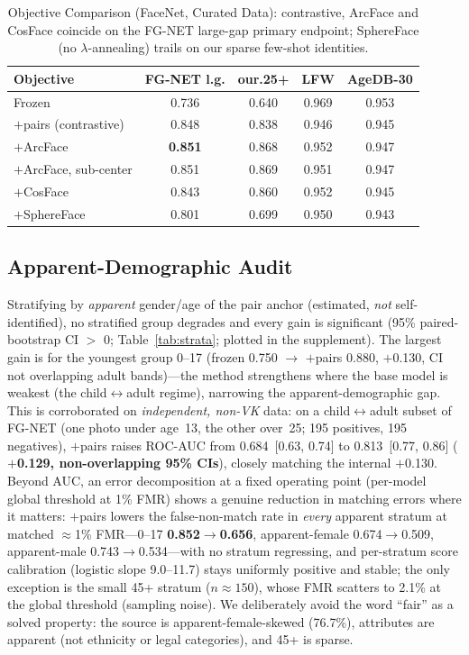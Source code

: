 \documentclass[journal]{IEEEtran}
\begin{document}
\begin{table}[!t]
\renewcommand{\arraystretch}{1.2}
\caption{Objective Comparison (FaceNet, Curated Data): contrastive, ArcFace and CosFace coincide on the FG-NET large-gap primary endpoint; SphereFace (no $\lambda$-annealing) trails on our sparse few-shot identities.}
\label{tab:objective}
\centering
\footnotesize
\begin{tabular}{@{}lcccc@{}}
\toprule
Objective & FG-NET l.g. & our.25+ & LFW & AgeDB-30 \\
\midrule
Frozen & 0.736 & 0.640 & 0.969 & 0.953 \\
$+$pairs (contrastive) & 0.848 & 0.838 & 0.946 & 0.945 \\
$+$ArcFace & \textbf{0.851} & 0.868 & 0.952 & 0.947 \\
$+$ArcFace, sub-center & 0.851 & 0.869 & 0.951 & 0.947 \\
$+$CosFace & 0.843 & 0.860 & 0.952 & 0.945 \\
$+$SphereFace & 0.801 & 0.699 & 0.950 & 0.943 \\
\bottomrule
\end{tabular}
\end{table}

\subsection{Apparent-Demographic Audit}\label{sec:res-fairness}
Stratifying by \emph{apparent} gender/age of the pair anchor (estimated, \emph{not} self-identified), no stratified group degrades and every gain is significant (95\% paired-bootstrap CI $>$ 0; Table~\ref{tab:strata}; plotted in the supplement). The largest gain is for the youngest group 0--17 (frozen 0.750 $\rightarrow$ $+$pairs 0.880, $+$0.130, CI not overlapping adult bands)---the method strengthens where the base model is weakest (the child$\leftrightarrow$adult regime), narrowing the apparent-demographic gap. This is corroborated on \emph{independent, non-VK} data: on a child$\leftrightarrow$adult subset of FG-NET (one photo under age~13, the other over~25; 195 positives, 195 negatives), $+$pairs raises ROC-AUC from 0.684~[0.63, 0.74] to 0.813~[0.77, 0.86] (\textbf{$+$0.129, non-overlapping 95\% CIs}), closely matching the internal $+$0.130. Beyond AUC, an error decomposition at a fixed operating point (per-model global threshold at 1\% FMR) shows a genuine reduction in matching errors where it matters: $+$pairs lowers the false-non-match rate in \emph{every} apparent stratum at matched $\approx$1\% FMR---0--17 \textbf{0.852$\rightarrow$0.656}, apparent-female 0.674$\rightarrow$0.509, apparent-male 0.743$\rightarrow$0.534---with no stratum regressing, and per-stratum score calibration (logistic slope 9.0--11.7) stays uniformly positive and stable; the only exception is the small 45+ stratum ($n{\approx}150$), whose FMR scatters to 2.1\% at the global threshold (sampling noise). We deliberately avoid the word ``fair'' as a solved property: the source is apparent-female-skewed (76.7\%), attributes are apparent (not ethnicity or legal categories), and 45+ is sparse.
\end{document}
